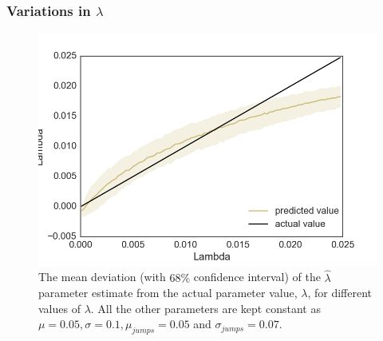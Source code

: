 \documentclass[11pt,oneside,openany,a4paper,english, report, goldenblock
]{usthesis}
\begin{document}
\clearpage
\subsubsection{Variations in $\lambda$}
\begin{figure}[h]
	\centering
	\includegraphics[width=0.43\linewidth]{Images/Output-Sensitivity-Results/ConvolutionalNN-MultipleOutput-ELU/Varying-Lambda/Lambda}
	\caption{The mean deviation (with $68\%$ confidence interval) of the $\hat{\lambda}$ parameter estimate from the actual parameter value, $\lambda$, for different values of $\lambda$. All the other parameters are kept constant as $\mu = 0.05, \sigma = 0.1, \mu_{jumps} = 0.05$ and $\sigma_{jumps} = 0.07$.}
	\label{fig:appendix:sensitivity_test:multiple_output:varying_lambda:lambda}
\end{figure}
\end{document}
